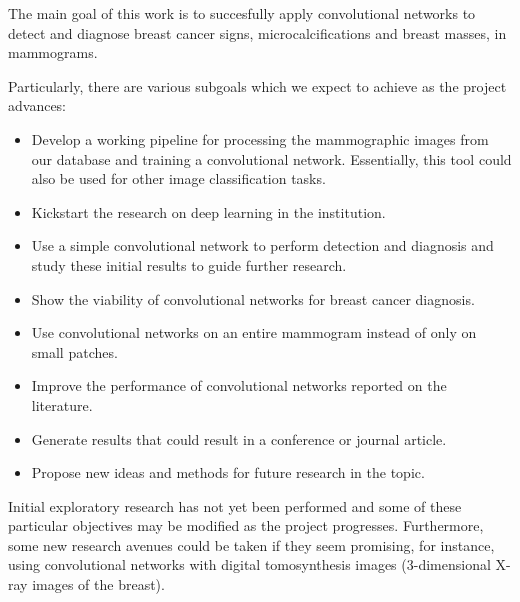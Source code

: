 The main goal of this work is to succesfully apply convolutional networks to detect and diagnose breast cancer signs, microcalcifications and breast masses, in mammograms.

Particularly, there are various subgoals which we expect to achieve as the project advances:
\begin{itemize}
	\item Develop a working pipeline for processing the mammographic images from our database and training a convolutional network. Essentially, this tool could also be used for other image classification tasks.
	\item Kickstart the research on deep learning in the institution.
	\item Use a simple convolutional network to perform detection and diagnosis and study these initial results to guide further research.
	\item Show the viability of convolutional networks for breast cancer diagnosis.
	\item Use convolutional networks on an entire mammogram instead of only on small patches.
	\item Improve the performance of convolutional networks reported on the literature.
	\item Generate results that could result in a conference or journal article.
	\item Propose new ideas and methods for future research in the topic.
\end{itemize}
Initial exploratory research has not yet been performed and some of these particular objectives may be modified as the project progresses. Furthermore, some new research avenues could be taken if they seem promising, for instance, using convolutional networks with digital tomosynthesis images (3-dimensional X-ray images of the breast).


\begin{comment}
Especificar en esta sección qué es lo que quiere lograr con respecto al problema identificado
en forma general y particular. Puede incluir alcances y cualquier otro
elemento que considere pertinente para delimitar su trabajo. 

{\bf Por ejemplo:}

El objetivo general de este trabajo.......

Los objetivos particulares a cumplir en este trabajo de investigación son los
siguientes: 
\begin{itemize}
	\item El primer objetivo...
	\item El segundo objetivo...
\end{itemize}

Esta sección puede contener también el {\it Modelo Particular}, que es el modelo de solución propuesto para el
problema y que obviamente debe ser consistente con los objetivos
establecidos. Se le llama {\it Modelo Particular}
 porque es en el cual se guía
el trabajo de investigación y que desemboca en lo que es la
 {\bf CONTRIBUCIÓN PERSONAL}.
Aquí es donde los aspectos de creatividad e innovación deben verse aplicados a nuestro
trabajo.
\end{comment}
